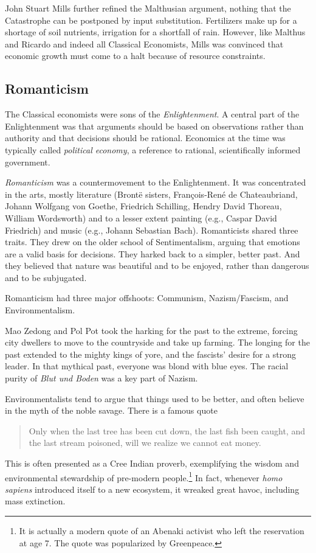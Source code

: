 John Stuart Mills further refined the Malthusian argument, nothing that the Catastrophe can be postponed by input substitution. Fertilizers make up for a shortage of soil nutrients, irrigation for a shortfall of rain. However, like Malthus and Ricardo and indeed all Classical Economists, Mills was convinced that economic growth must come to a halt because of resource constraints. 

\subsection{Romanticism}
The Classical economists were sons of the \emph{Enlightenment}. A central part of the Enlightenment was that arguments should be based on observations rather than authority and that decisions should be rational. Economics at the time was typically called \emph{political economy}, a reference to rational, scientifically informed government.

\emph{Romanticism} was a countermovement to the Enlightenment. It was concentrated in the arts, mostly literature (Brontë sisters, François-René de Chateaubriand, Johann Wolfgang von Goethe, Friedrich Schilling, Hendry David Thoreau, William Wordsworth) and to a lesser extent painting (e.g., Caspar David Friedrich) and music (e.g., Johann Sebastian Bach). Romanticists shared three traits. They drew on the older school of Sentimentalism, arguing that emotions are a valid basis for decisions. They harked back to a simpler, better past. And they believed that nature was beautiful and to be enjoyed, rather than dangerous and to be subjugated.

Romanticism had three major offshoots: Communism, Nazism/Fascism, and Environmentalism.

Mao Zedong and Pol Pot took the harking for the past to the extreme, forcing city dwellers to move to the countryside and take up farming. The longing for the past extended to the mighty kings of yore, and the fascists' desire for a strong leader. In that mythical past, everyone was blond with blue eyes. The racial purity of \emph{Blut und Boden} was a key part of Nazism.

Environmentalists tend to argue that things used to be better, and often believe in the myth of the noble savage. There is a famous quote
\begin{quote}
    Only when the last tree has been cut down, the last fish been caught, and the last stream poisoned, will we realize we cannot eat money.
\end{quote}
This is often presented as a Cree Indian proverb, exemplifying the wisdom and environmental stewardship of pre-modern people.\footnote{It is actually a modern quote of an Abenaki activist who left the reservation at age 7. The quote was popularized by Greenpeace.} In fact, whenever \textit{homo sapiens} introduced itself to a new ecosystem, it wreaked great havoc, including mass extinction.

